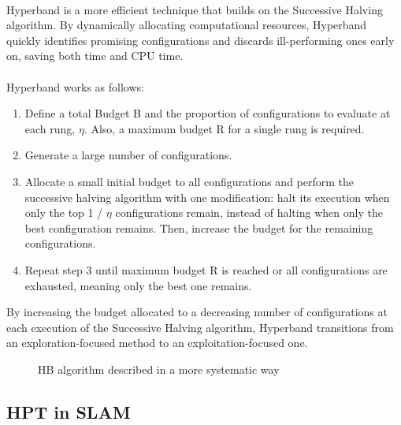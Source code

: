 \paragraph{}Hyperband is a more efficient technique that builds on the Successive Halving algorithm\cite{elshawi2019automated, }. By dynamically allocating computational resources, Hyperband quickly identifies promising configurations and discards ill-performing ones early on, saving both time and CPU time.
\paragraph{}Hyperband works as follows:
\begin{enumerate}
    \item Define a total Budget B and the proportion of configurations to evaluate at each rung, $\eta$. Also, a maximum budget R for a single rung is required\cite{falkner2018bohb}.
    \item Generate a large number of configuration\cite{falkner2018bohb, }s.
    \item Allocate a small initial budget to all configurations and perform the successive halving algorithm with one modification: halt its execution when only the top 1 / $\eta$ configurations remain, instead of halting when only the best configuration remains. Then, increase the budget for the remaining configurations\cite{falkner2018bohb}.
    \item Repeat step 3 until maximum budget R is reached or all configurations are exhausted, meaning only the best one remains\cite{falkner2018bohb}.
\end{enumerate}

By increasing the budget allocated to a decreasing number of configurations at each execution of the Successive Halving algorithm, Hyperband transitions from an exploration-focused method to an exploitation-focused one.

\begin{figure}[h]
    \centering
    
    \caption{\ac{HB} algorithm described in a more systematic way}
    \label{fig:enter-label}
\end{figure}

\newpage

\subsection{\ac{HPT} in \ac{SLAM}}
